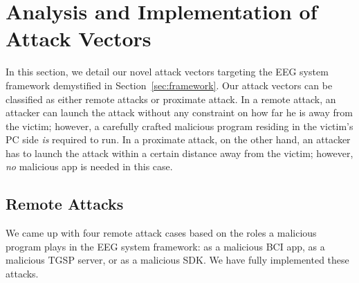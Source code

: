 \section{Analysis and Implementation of Attack Vectors}
\label{sec:attack}

In this section, we detail our novel attack vectors targeting the EEG system framework demystified in Section~\ref{sec:framework}. Our attack vectors can be classified as either remote attacks or proximate attack. In a remote attack, an attacker can launch the attack without any constraint on how far he is away from the victim; however, a carefully crafted malicious program residing in the victim's PC side \emph{is} required to run. In a proximate attack, on the other hand, an attacker has to launch the attack within a certain distance away from the victim; however, \emph{no} malicious app is needed in this case. %

\subsection{Remote Attacks}
We came up with four remote attack cases based on the roles a malicious program plays in the EEG system framework: as a malicious BCI app, as a malicious TGSP server, or as a malicious SDK. We have fully implemented these attacks. 


